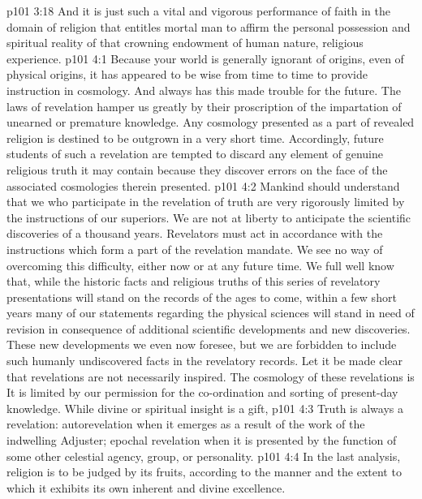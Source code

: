 \vs p101 3:18 And it is just such a vital and vigorous performance of faith in the domain of religion that entitles mortal man to affirm the personal possession and spiritual reality of that crowning endowment of human nature, religious experience.
\vs p101 4:1 Because your world is generally ignorant of origins, even of physical origins, it has appeared to be wise from time to time to provide instruction in cosmology. And always has this made trouble for the future. The laws of revelation hamper us greatly by their proscription of the impartation of unearned or premature knowledge. Any cosmology presented as a part of revealed religion is destined to be outgrown in a very short time. Accordingly, future students of such a revelation are tempted to discard any element of genuine religious truth it may contain because they discover errors on the face of the associated cosmologies therein presented.
\vs p101 4:2 Mankind should understand that we who participate in the revelation of truth are very rigorously limited by the instructions of our superiors. We are not at liberty to anticipate the scientific discoveries of a thousand years. Revelators must act in accordance with the instructions which form a part of the revelation mandate. We see no way of overcoming this difficulty, either now or at any future time. We full well know that, while the historic facts and religious truths of this series of revelatory presentations will stand on the records of the ages to come, within a few short years many of our statements regarding the physical sciences will stand in need of revision in consequence of additional scientific developments and new discoveries. These new developments we even now foresee, but we are forbidden to include such humanly undiscovered facts in the revelatory records. Let it be made clear that revelations are not necessarily inspired. The cosmology of these revelations is  It is limited by our permission for the co\hyp{}ordination and sorting of present\hyp{}day knowledge. While divine or spiritual insight is a gift, 
\vs p101 4:3 \pc Truth is always a revelation: autorevelation when it emerges as a result of the work of the indwelling Adjuster; epochal revelation when it is presented by the function of some other celestial agency, group, or personality.
\vs p101 4:4 In the last analysis, religion is to be judged by its fruits, according to the manner and the extent to which it exhibits its own inherent and divine excellence.
